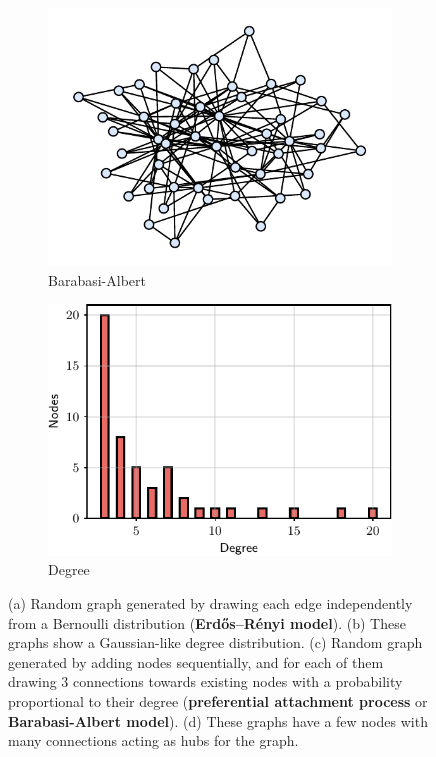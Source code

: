 \begin{figure}[t]
\begin{subfigure}[b]{0.24\textwidth}
    \includegraphics[width=\textwidth]{images/graph_2}
    \caption{Barabasi-Albert}
    \end{subfigure}
    \begin{subfigure}[b]{0.24\textwidth}
    \includegraphics[width=\textwidth]{images/graph_2_degree}
    \caption{Degree}
    \end{subfigure}
    \caption{(a) Random graph generated by drawing each edge independently from a Bernoulli distribution (\textbf{Erdős–Rényi model}). (b) These graphs show a Gaussian-like degree distribution. (c) Random graph generated by adding nodes sequentially, and for each of them drawing $3$ connections towards existing nodes with a probability proportional to their degree (\textbf{preferential attachment process} or \textbf{Barabasi-Albert model}). (d) These graphs have a few nodes with many connections acting as hubs for the graph.}
    \label{fig:random_graphs}
\end{figure}

